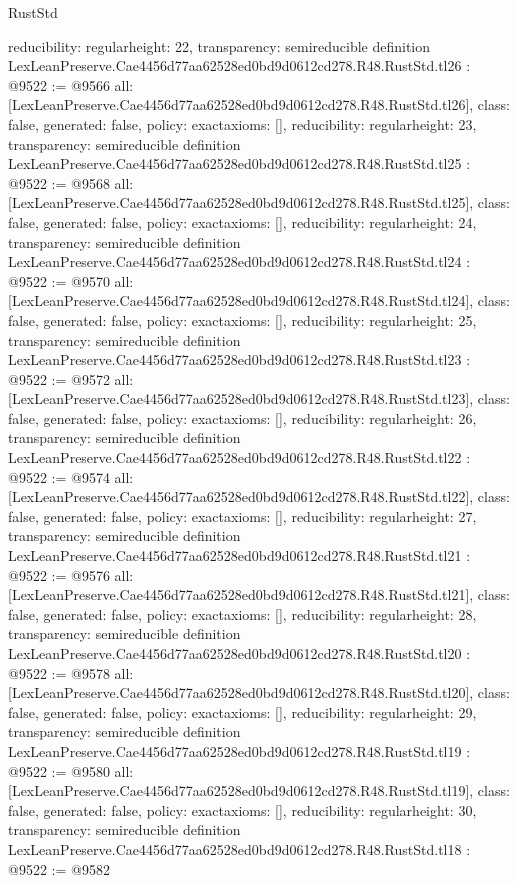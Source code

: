 \begin{lexlean}{RustStd}
\begin{coremodule}
{  reducibility: regular{height: 22},
  transparency: semireducible
}
definition LexLeanPreserve.Cae4456d77aa62528ed0bd9d0612cd278.R48.RustStd.tl26 : @9522 := @9566 {
  all: [LexLeanPreserve.Cae4456d77aa62528ed0bd9d0612cd278.R48.RustStd.tl26],
  class: false,
  generated: false,
  policy: exact{axioms: []},
  reducibility: regular{height: 23},
  transparency: semireducible
}
definition LexLeanPreserve.Cae4456d77aa62528ed0bd9d0612cd278.R48.RustStd.tl25 : @9522 := @9568 {
  all: [LexLeanPreserve.Cae4456d77aa62528ed0bd9d0612cd278.R48.RustStd.tl25],
  class: false,
  generated: false,
  policy: exact{axioms: []},
  reducibility: regular{height: 24},
  transparency: semireducible
}
definition LexLeanPreserve.Cae4456d77aa62528ed0bd9d0612cd278.R48.RustStd.tl24 : @9522 := @9570 {
  all: [LexLeanPreserve.Cae4456d77aa62528ed0bd9d0612cd278.R48.RustStd.tl24],
  class: false,
  generated: false,
  policy: exact{axioms: []},
  reducibility: regular{height: 25},
  transparency: semireducible
}
definition LexLeanPreserve.Cae4456d77aa62528ed0bd9d0612cd278.R48.RustStd.tl23 : @9522 := @9572 {
  all: [LexLeanPreserve.Cae4456d77aa62528ed0bd9d0612cd278.R48.RustStd.tl23],
  class: false,
  generated: false,
  policy: exact{axioms: []},
  reducibility: regular{height: 26},
  transparency: semireducible
}
definition LexLeanPreserve.Cae4456d77aa62528ed0bd9d0612cd278.R48.RustStd.tl22 : @9522 := @9574 {
  all: [LexLeanPreserve.Cae4456d77aa62528ed0bd9d0612cd278.R48.RustStd.tl22],
  class: false,
  generated: false,
  policy: exact{axioms: []},
  reducibility: regular{height: 27},
  transparency: semireducible
}
definition LexLeanPreserve.Cae4456d77aa62528ed0bd9d0612cd278.R48.RustStd.tl21 : @9522 := @9576 {
  all: [LexLeanPreserve.Cae4456d77aa62528ed0bd9d0612cd278.R48.RustStd.tl21],
  class: false,
  generated: false,
  policy: exact{axioms: []},
  reducibility: regular{height: 28},
  transparency: semireducible
}
definition LexLeanPreserve.Cae4456d77aa62528ed0bd9d0612cd278.R48.RustStd.tl20 : @9522 := @9578 {
  all: [LexLeanPreserve.Cae4456d77aa62528ed0bd9d0612cd278.R48.RustStd.tl20],
  class: false,
  generated: false,
  policy: exact{axioms: []},
  reducibility: regular{height: 29},
  transparency: semireducible
}
definition LexLeanPreserve.Cae4456d77aa62528ed0bd9d0612cd278.R48.RustStd.tl19 : @9522 := @9580 {
  all: [LexLeanPreserve.Cae4456d77aa62528ed0bd9d0612cd278.R48.RustStd.tl19],
  class: false,
  generated: false,
  policy: exact{axioms: []},
  reducibility: regular{height: 30},
  transparency: semireducible
}
definition LexLeanPreserve.Cae4456d77aa62528ed0bd9d0612cd278.R48.RustStd.tl18 : @9522 := @9582 {
}
\end{coremodule}
\end{lexlean}
